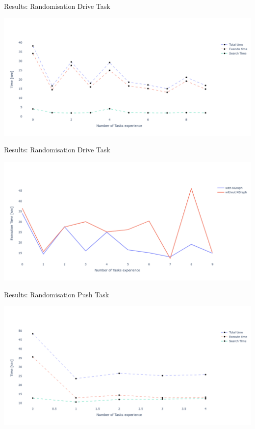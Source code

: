 
\begin{frame}[fragile]{Results: Randomisation Drive Task} %
\begin{center}
\includegraphics[width=1.0\textwidth]{figures/results/random_drive_execution_times}
\end{center}
\end{frame}

\begin{frame}[fragile]{Results: Randomisation Drive Task} %
\begin{center}
\includegraphics[width=1.0\textwidth]{figures/results/random_drive_with_without_kgraph}
\end{center}
\end{frame}
\begin{frame}[fragile]{Results: Randomisation Push Task} %
\begin{center}
\includegraphics[width=1.0\textwidth]{figures/results/random_push_execution_times}
\end{center}
\end{frame}

